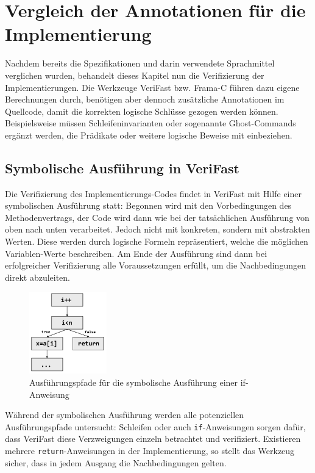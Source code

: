 ﻿\chapter{Vergleich der Annotationen für die Implementierung}

Nachdem bereits die Spezifikationen und darin verwendete Sprachmittel verglichen wurden,
behandelt dieses Kapitel nun die Verifizierung der Implementierungen.
Die Werkzeuge VeriFast bzw. Frama-C führen dazu eigene Berechnungen durch, benötigen aber dennoch
zusätzliche Annotationen im Quellcode, damit die korrekten logische Schlüsse gezogen 
werden können. Beispielsweise müssen Schleifeninvarianten oder sogenannte
Ghost-Commands ergänzt werden, die Prädikate oder weitere logische Beweise mit einbeziehen.


\section{Symbolische Ausführung in VeriFast}

Die Verifizierung des Implementierungs-Codes findet in VeriFast mit Hilfe einer symbolischen Ausführung statt:
Begonnen wird mit den Vorbedingungen des Methodenvertrags, der Code wird dann wie bei der tatsächlichen
Ausführung von oben nach unten verarbeitet. Jedoch nicht mit konkreten, sondern mit 
abstrakten Werten. Diese werden durch logische Formeln repräsentiert, welche die möglichen Variablen-Werte 
beschreiben. Am Ende der Ausführung sind dann bei erfolgreicher Verifizierung alle Voraussetzungen
erfüllt, um die Nachbedingungen direkt abzuleiten.

\begin{figure}
	\centering
		\includegraphics[width=0.3\textwidth]{images/symbolic_execution.png}
		\caption{Ausführungspfade für die symbolische Ausführung einer if-Anweisung}
\end{figure}

Während der symbolischen Ausführung werden alle potenziellen Ausführungspfade untersucht: Schleifen
oder auch \texttt{if}-Anweisungen sorgen dafür, dass VeriFast diese Verzweigungen einzeln betrachtet
und verifiziert. Existieren mehrere \texttt{return}-Anweisungen in der Implementierung, so stellt
das Werkzeug sicher, dass in jedem Ausgang die Nachbedingungen gelten.

